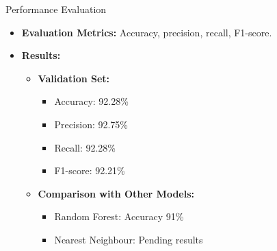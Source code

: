\documentclass{beamer}
\begin{document}
\begin{frame}{Performance Evaluation}
  \begin{itemize}
    \item \textbf{Evaluation Metrics:} Accuracy, precision, recall, F1-score.
    \item \textbf{Results:}
      \begin{itemize}
        \item \textbf{Validation Set:}
          \begin{itemize}
            \item Accuracy: 92.28\%
            \item Precision: 92.75\%
            \item Recall: 92.28\%
            \item F1-score: 92.21\%
          \end{itemize}
        \item \textbf{Comparison with Other Models:}
          \begin{itemize}
            \item Random Forest: Accuracy 91\%
            \item Nearest Neighbour: Pending results
          \end{itemize}
      \end{itemize}
  \end{itemize}
\end{frame}
\end{document}
